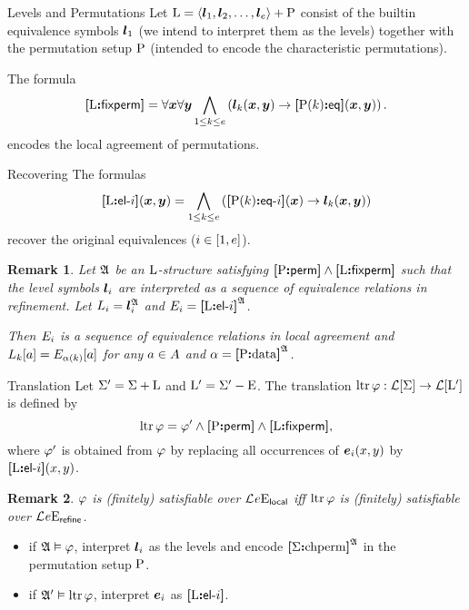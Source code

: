 \documentclass{beamer}
\newtheorem{remark}{Remark}
\begin{document}
\begin{frame}{Levels and Permutations}
Let ${\mathrm{L}} = \left\langle \bm{l}_{1},\bm{l}_{2},\dots,\bm{l}_{e} \right\rangle + {\mathrm{P}}$ consist of the builtin
equivalence symbols $\bm{l}_{1}$ (we intend to interpret them as the levels)
together with the permutation setup ${\mathrm{P}}$ (intended to encode the
characteristic permutations).

The formula
\[
  {\bm{[}{\mathrm{L}}\mathord{\bm{:}}\mathsf{fixperm}\bm{]}} = \forall\bm{x} \forall\bm{y} \bigwedge_{1 \leq k \leq e}
  \left(\bm{l}_{k}(\bm{x},\bm{y}) \rightarrow {\bm{[}{\mathrm{P}}(k)\mathord{\bm{:}}\mathsf{eq}\bm{]}}(\bm{x},\bm{y})\right).
\]
encodes the local agreement of permutations.
\end{frame}

\begin{frame}{Recovering}
The formulas
\[
  {\bm{[}{\mathrm{L}}\mathord{\bm{:}}\mathsf{el}{\hbox{-}}i\bm{]}}(\bm{x},\bm{y}) = \bigwedge_{1 \leq k \leq e}
  \left({\bm{[}{\mathrm{P}}(k)\mathord{\bm{:}}\mathsf{eq}{\hbox{-}}i\bm{]}}(\bm{x}) \rightarrow \bm{l}_{k}(\bm{x},\bm{y})\right)
\]
recover the original equivalences ($i\in[1,e]$).
\begin{remark}
Let $\mathfrak{A}$ be an ${\mathrm{L}}$-structure satisfying
${\bm{[}{\mathrm{P}}\mathord{\bm{:}}\mathsf{perm}\bm{]}}\land{\bm{[}{\mathrm{L}}\mathord{\bm{:}}\mathsf{fixperm}\bm{]}}$ such that the level symbols $\bm{l}_{i}$ are
interpreted as a sequence of equivalence relations in refinement.
Let $L_{i} = \bm{l}_{i}^{\mathfrak{A}}$ and $E_{i} = {\bm{[}{\mathrm{L}}\mathord{\bm{:}}\mathsf{el}{\hbox{-}}i\bm{]}}^{\mathfrak{A}}$.

Then $E_{i}$ is a sequence of equivalence relations in local agreement and
$L_{k}[a] = E_{\alpha(k)}[a]$ for any $a\in A$ and $\alpha =
{\bm{[}{\mathrm{P}}\mathord{\bm{:}}\mathrm{data}\bm{]}}^{\mathfrak{A}}$.
\end{remark}
\end{frame}

\begin{frame}{Translation}
Let $\Sigma' = \Sigma + {\mathrm{L}}$ and ${\mathrm{L}}' = \Sigma' - {\mathrm{E}}$.
The translation $\operatorname{ltr}\varphi : \mathcal{L}[\Sigma] \to \mathcal{L}[{{\mathrm{L}}'}]$ is defined by
\[
  \operatorname{ltr}\varphi = {\varphi'} \land {\bm{[}{\mathrm{P}}\mathord{\bm{:}}\mathsf{perm}\bm{]}} \land {\bm{[}{\mathrm{L}}\mathord{\bm{:}}\mathsf{fixperm}\bm{]}},
\]
where ${\varphi'}$ is obtained from $\varphi$ by replacing all occurrences
of $\bm{e}_{i}(x,y)$ by ${\bm{[}{\mathrm{L}}\mathord{\bm{:}}\mathsf{el}{\hbox{-}}i\bm{]}}(x,y)$.
\begin{remark}
$\varphi$ is (finitely) satisfiable over $\mathcal{L}^{{}}_{{}}{e}\mathrm{E}_{\mathsf{local}}$ iff
$\operatorname{ltr}\varphi$ is (finitely) satisfiable over
$\mathcal{L}^{{}}_{{}}{e}\mathrm{E}_{\mathsf{refine}}$.
\end{remark}
\begin{itemize}
  \item
  if $\mathfrak{A}\vDash\varphi$, interpret $\bm{l}_{i}$ as the levels and encode
  ${\bm{[}\Sigma\mathord{\bm{:}}\mathrm{chperm}\bm{]}}^{\mathfrak{A}}$ in the permutation setup ${\mathrm{P}}$.
  
  \item
  if $\mathfrak{A'}\vDash\operatorname{ltr}\varphi$, interpret $\bm{e}_{i}$ as ${\bm{[}{\mathrm{L}}\mathord{\bm{:}}\mathsf{el}{\hbox{-}}i\bm{]}}$.
\end{itemize}
\end{frame}
\end{document}
